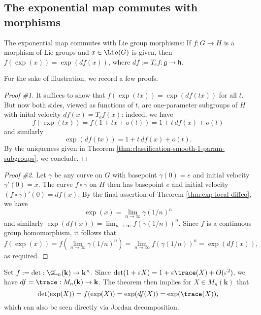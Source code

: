 \documentclass[reqno]{amsart} 
\def\eps{\varepsilon}
\begin{document}
\subsection{The exponential map commutes with morphisms\label{sec:exp-commutes-with-morphisms}}
\label{sec:org45e312b}
\begin{theorem}
  The exponential map commutes with Lie group morphisms:
  If $f : G \rightarrow H$ is a morphism of Lie groups
  and $x \in \Lie(G)$ is given,
  then
  $f(\exp (x)) = \exp(d f(x))$, where $d f := T_e f : \mathfrak{g} \rightarrow \mathfrak{h}$.
\end{theorem}
For the sake of illustration, we record a few proofs.
\begin{proof}
[Proof \#1]
  It suffices to show that
  $f(\exp(t x)) = \exp(d f(t x))$ for all $t$.
  But now both sides, viewed as functions of $t$,
  are one-parameter subgroups
  of $H$
  with inital velocity
  $d f(x) = T_e f(x)$:
  indeed, we have
  \begin{equation*}
  f(\exp(t x))
  = f(1 + t x + o(t))
  = 1 + t \,d f(x)  + o(t)
  \end{equation*}
  and similarly
  \begin{equation*}
  \exp(d f(t x)) = 1 + t \, d f(x) + o(t).
  \end{equation*}
  By the uniqueness given in Theorem
  \ref{thm:classification-smooth-1-param-subgroups},
  we conclude.
\end{proof}
\begin{proof}
[Proof \#2]
  Let $\gamma$ be any curve on $G$ with
  basepoint $\gamma(0) = e$ and initial velocity $\gamma '(0) =
  x$.
  The curve $f \circ \gamma$ on $H$ then has basepoint $e$
  and initial velocity $(f \circ \gamma )'(0) = d f(x)$.
  By the final assertion of Theorem \ref{thm:exp-local-diffeo},
  we have
  \begin{equation*}
\exp (x) = \lim_{n \rightarrow \infty} \gamma(1/n)^n
\end{equation*}
  and similarly $\exp(d f(x)) = \lim_{n \rightarrow \infty}
  f(\gamma(1/n))^n$.
  Since $f$ is a continuous group homomorphism, it follows that
  \begin{equation*}
  f(\exp(x))
  = f( \lim_{n \rightarrow \infty} \gamma(1/n)^n)
  = \lim_{n \rightarrow \infty} f(\gamma(1/n))^n
  = \exp(d f(x)),
  \end{equation*}
  as required.
\end{proof}

\begin{example}
  Set $f := \det : \GL_n(\mathbf{k}) \rightarrow
  \mathbf{k}^\times$.
  Since $\det(1 + \eps X) = 1 + \eps \trace(X) + O(\eps^2)$,
  we have $d f = \trace : M_n(\mathbf{k}) \rightarrow
  \mathbf{k}$.
  The theorem then implies for $X \in M_n(\mathbf{k})$ that
  \begin{equation*}
    \det(\exp(X)) = f(\exp(X))
    = \exp(d f(X)) = \exp(\trace(X)),
  \end{equation*}
  which can also be seen directly via Jordan decomposition.
\end{example}
\end{document}

